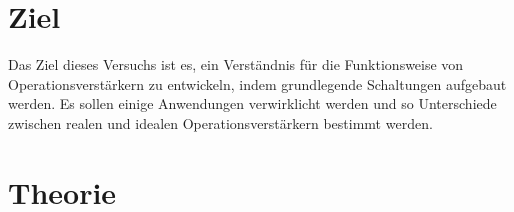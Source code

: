 \section{Ziel}
Das Ziel dieses Versuchs ist es, ein Verständnis für die Funktionsweise von Operationsverstärkern zu entwickeln, indem grundlegende Schaltungen aufgebaut werden. Es sollen einige Anwendungen verwirklicht werden und so Unterschiede zwischen realen und idealen Operationsverstärkern bestimmt werden. %


\section{Theorie}
